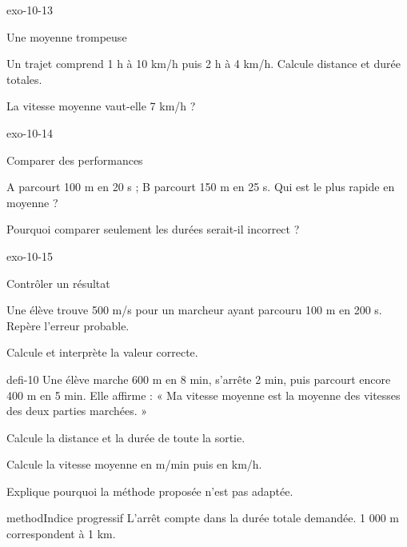\documentclass[12pt,twoside,openany]{book}
\begin{document}
\begin{blocLivre}{exo-10-13}
\begin{exercice}[3]{Une moyenne trompeuse}
\begin{questions}
\item Un trajet comprend 1 h à 10 km/h puis 2 h à 4 km/h. Calcule distance et durée totales.
\item La vitesse moyenne vaut-elle 7 km/h ?
\end{questions}
\end{exercice}\end{blocLivre}
\begin{blocLivre}{exo-10-14}
\begin{exercice}[3]{Comparer des performances}
\begin{questions}
\item A parcourt 100 m en 20 s ; B parcourt 150 m en 25 s. Qui est le plus rapide en moyenne ?
\item Pourquoi comparer seulement les durées serait-il incorrect ?
\end{questions}
\end{exercice}\end{blocLivre}
\begin{blocLivre}{exo-10-15}
\begin{exercice}[3]{Contrôler un résultat}
\begin{questions}
\item Une élève trouve 500 m/s pour un marcheur ayant parcouru 100 m en 200 s. Repère l’erreur probable.
\item Calcule et interprète la valeur correcte.
\end{questions}
\end{exercice}\end{blocLivre}
\label{defi-ex-10}
\begin{pcFiche}{defi-10}
Une élève marche 600 m en 8 min, s’arrête 2 min, puis parcourt encore 400 m en 5 min. Elle affirme : « Ma vitesse moyenne est la moyenne des vitesses des deux parties marchées. »\par
{}
\begin{questions}
\item Calcule la distance et la durée de toute la sortie.
\item Calcule la vitesse moyenne en m/min puis en km/h.
\item Explique pourquoi la méthode proposée n’est pas adaptée.
\end{questions}
\begin{pcEncadre}{method}{Indice progressif}
L’arrêt compte dans la durée totale demandée. 1 000 m correspondent à 1 km.\par
\end{pcEncadre}
\end{pcFiche}
\end{document}
